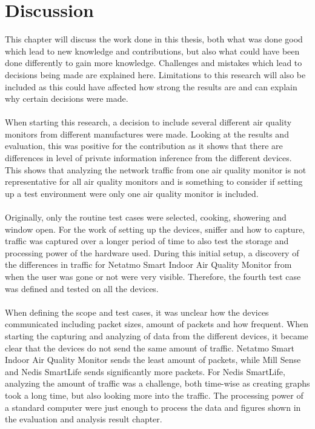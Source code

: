 \chapter{Discussion}
This chapter will discuss the work done in this thesis, both what was done good which lead to new knowledge and contributions, but also what could have been done differently to gain more knowledge. Challenges and mistakes which lead to decisions being made are explained here. Limitations to this research will also be included as this could have affected how strong the results are and can explain why certain decisions were made. 
\\\\
When starting this research, a decision to include several different air quality monitors from different manufactures were made. Looking at the results and evaluation, this was positive for the contribution as it shows that there are differences in level of private information inference from the different devices. This shows that analyzing the network traffic from one air quality monitor is not representative for all air quality monitors and is something to consider if setting up a test environment were only one air quality monitor is included.
\\\\
Originally, only the routine test cases were selected, cooking, showering and window open. For the work of setting up the devices, sniffer and how to capture, traffic was captured over a longer period of time to also test the storage and processing power of the hardware used. During this initial setup, a discovery of the differences in traffic for Netatmo Smart Indoor Air Quality Monitor from when the user was gone or not were very visible. Therefore, the fourth test case was defined and tested on all the devices. 
\\\\
When defining the scope and test cases, it was unclear how the devices communicated including packet sizes, amount of packets and how frequent. When starting the capturing and analyzing of data from the different devices, it became clear that the devices do not send the same amount of traffic. Netatmo Smart Indoor Air Quality Monitor sends the least amount of packets, while Mill Sense and Nedis SmartLife sends significantly more packets. For Nedis SmartLife, analyzing the amount of traffic was a challenge, both time-wise as creating graphs took a long time, but also looking more into the traffic. The processing power of a standard computer were just enough to process the data and figures shown in the evaluation and analysis result chapter. 
